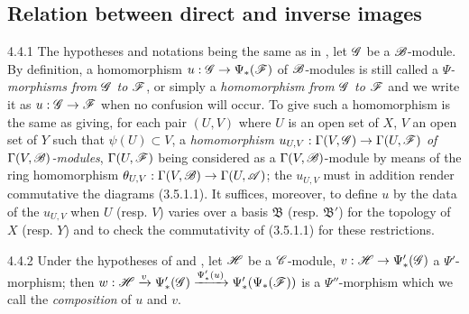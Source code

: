 \subsection{Relation between direct and inverse images}
\label{0-prelim-4.4}

\begin{env}{4.4.1}
\label{env-0.4.4.1}
The hypotheses and notations being the same as in , let $\mathscr{G}$ be a
$\mathscr{B}$-module. By definition, a homomorphism $u:\mathscr{G}\to\Psi_*(\mathscr{F})$ of
$\mathscr{B}$-modules is still called a \emph{$\Psi$-morphisms from $\mathscr{G}$ to $\mathscr{F}$}, or
simply a \emph{homomorphism from $\mathscr{G}$ to $\mathscr{F}$} and we write it as $u:\mathscr{G}\to\mathscr{F}$
when no confusion will occur. To give such a homomorphism is the same as giving, for each
pair $(U,V)$ where $U$ is an open set of $X$, $V$ an open set of $Y$ such that
$\psi(U)\subset V$, a \emph{homomorphism $u_{U,V}:\Gamma(V,\mathscr{G})\to\Gamma(U,\mathscr{F})$ of
$\Gamma(V,\mathscr{B})$-modules}, $\Gamma(U,\mathscr{F})$ being considered as a
$\Gamma(V,\mathscr{B})$-module by means of the ring homomorphism
$\theta_{U,V}:\Gamma(V,\mathscr{B})\to\Gamma(U,\mathscr{A})$; the $u_{U,V}$ must in addition render
commutative the diagrams (3.5.1.1). It suffices, moreover, to define $u$ by the data of the
$u_{U,V}$ when $U$ (resp. $V$) varies over a basis $\mathfrak{B}$ (resp. $\mathfrak{B}'$) for
the topology of $X$ (resp. $Y$) and to check the commutativity of (3.5.1.1) for these
restrictions.
\end{env}

\begin{env}{4.4.2}
\label{env-0.4.4.2}
Under the hypotheses of  and , let $\mathscr{H}$ be a
$\mathscr{C}$-module, $v:\mathscr{H}\to\Psi_*'(\mathscr{G})$ a $\Psi'$-morphism; then
$w:\mathscr{H}\xrightarrow{v}\Psi_*'(\mathscr{G})\xrightarrow{\Psi_*'(u)}\Psi_*'(\Psi_*(\mathscr{F}))$ is
a $\Psi''$-morphism which we call the \emph{composition} of $u$ and $v$.
\end{env}

